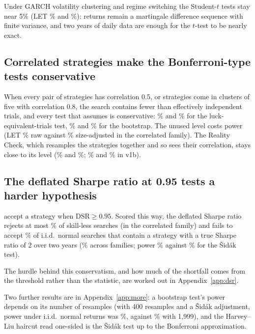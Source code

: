 Under GARCH volatility clustering and regime switching the Student-$t$ tests stay near 5\% (LET \% and \%): returns remain a martingale difference sequence with finite variance, and two years of daily data are enough for the $t$-test to be nearly exact.

\subsection{Correlated strategies make the Bonferroni-type tests conservative}
When every pair of strategies has correlation 0.5, or strategies come in clusters of five with correlation 0.8, the search contains fewer than  effectively independent trials, and every test that assumes  is conservative: \% and \% for the luck-equivalent-trials test, \% and \% for the bootstrap. The unused level costs power (LET \% raw against \% size-adjusted in the correlated family). The Reality Check, which resamples the strategies together and so sees their correlation, stays close to its level (\% and \%; \% and \% in v1b).

\subsection{The deflated Sharpe ratio at 0.95 tests a harder hypothesis}
\citet{bailey2014dsr} accept a strategy when $\mathrm{DSR}\ge 0.95$. Scored this way, the deflated Sharpe ratio rejects at most \% of skill-less searches (in the correlated family) and fails to accept \% of i.i.d.\ normal searches that contain a strategy with a true Sharpe ratio of 2 over two years (\% across families; power \% against \% for the \v{S}id\'ak test).

The hurdle behind this conservatism, and how much of the shortfall comes from the threshold rather than the statistic, are worked out in Appendix~\ref{app:dsr}.

Two further results are in Appendix~\ref{app:more}: a bootstrap test's power depends on its number of resamples (with 400 resamples and a \v{S}id\'ak adjustment, power under i.i.d.\ normal returns was \%, against \% with 1,999), and the Harvey--Liu haircut read one-sided is the \v{S}id\'ak test up to the Bonferroni approximation.
